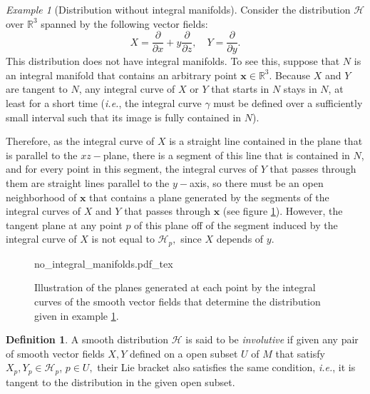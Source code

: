 \documentclass[12pt, letterpaper, reqno]{amsart}
\newcommand{\incfig}[2][1]{%
    \def\svgwidth{#1\columnwidth}
    {#2.pdf_tex}
}
\theoremstyle{definition}
\newtheorem{df}{Definition}
\theoremstyle{plain}
\theoremstyle{remark}
\newtheorem{ex}{Example}
\begin{document}
\begin{ex}[Distribution without integral manifolds] \label{ex:no_integral_manifolds}
	Consider the distribution $ \mathcal{H} $ over $ \mathbb{R}^3 $ spanned by the following vector fields: 
	$$ X = \frac{\partial}{\partial x} + y \frac{\partial}{\partial z}, \quad Y = \frac{\partial}{\partial y}.  $$ 
	This distribution does not have integral manifolds. To see this, suppose that $ N $ is an integral manifold that contains an arbitrary point $ \textbf{x} \in \mathbb{R}^3.  $ Because $ X $ and $ Y $ are tangent to $ N $, any integral curve of $ X $ or $ Y $ that starts in $ N $ stays in $ N $, at least for a short time (\textit{i.e.}, the integral curve $ \gamma $ must be defined over a sufficiently small interval such that its image is fully contained in $ N $).   

	Therefore, as the integral curve of $ X $ is a straight line contained in the plane that is parallel to the $ xz- $plane, there is a segment of this line that is contained in $ N $, and for every point in this segment, the integral curves of $ Y $ that passes through them are straight lines parallel to the $ y- $axis, so there must be an open neighborhood of $ \textbf{x}  $ that contains a plane generated by the segments of the integral curves of $ X $ and $ Y $ that passes through $ \textbf{x}$ (see figure \ref{fig:no_integral_manifolds}). However, the tangent plane at any point $ p $  of this plane  off of the segment induced by the integral curve of $ X $ is not equal to $ \mathcal{H}_p, $ since $ X $ depends of $ y $.   
\end{ex}

\begin{figure}
    \centering
    \incfig{no_integral_manifolds}
    \caption{Illustration of the planes generated at each point by the integral curves of the smooth vector fields that determine the distribution given in example \ref{ex:no_integral_manifolds}.}
    \label{fig:no_integral_manifolds}
\end{figure}

\begin{df}
	
A smooth distribution $ \mathcal{H} $ is said to be \textit{involutive} if given any pair of smooth vector fields $ X,Y $ defined on a open subset $ U $  of $ M $  that satisfy $X_p,Y_p\in \mathcal{H}_p $, $ p\in U, $ their Lie bracket also satisfies the same condition, \textit{i.e.}, it is tangent to the distribution in the given open subset. 
\end{df}
\end{document}
